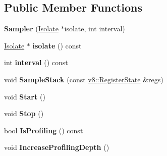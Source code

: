 \subsection*{Public Member Functions}
\begin{DoxyCompactItemize}
\item 
{\bfseries Sampler} (\hyperlink{classv8_1_1internal_1_1_isolate}{Isolate} $\ast$isolate, int interval)\hypertarget{classv8_1_1internal_1_1_sampler_a2a11e616d00bc5369d44e76113ff48bb}{}\label{classv8_1_1internal_1_1_sampler_a2a11e616d00bc5369d44e76113ff48bb}

\item 
\hyperlink{classv8_1_1internal_1_1_isolate}{Isolate} $\ast$ {\bfseries isolate} () const \hypertarget{classv8_1_1internal_1_1_sampler_ac03a5a700f506b92eeec457aaa618d21}{}\label{classv8_1_1internal_1_1_sampler_ac03a5a700f506b92eeec457aaa618d21}

\item 
int {\bfseries interval} () const \hypertarget{classv8_1_1internal_1_1_sampler_a95ac452fc3a30dff69891f742a5c9488}{}\label{classv8_1_1internal_1_1_sampler_a95ac452fc3a30dff69891f742a5c9488}

\item 
void {\bfseries Sample\+Stack} (const \hyperlink{structv8_1_1_register_state}{v8\+::\+Register\+State} \&regs)\hypertarget{classv8_1_1internal_1_1_sampler_a9a8ee8fc9e59968d010ead4a0ac293d1}{}\label{classv8_1_1internal_1_1_sampler_a9a8ee8fc9e59968d010ead4a0ac293d1}

\item 
void {\bfseries Start} ()\hypertarget{classv8_1_1internal_1_1_sampler_a49677027e31c1bbe7f6bd66267b9d0db}{}\label{classv8_1_1internal_1_1_sampler_a49677027e31c1bbe7f6bd66267b9d0db}

\item 
void {\bfseries Stop} ()\hypertarget{classv8_1_1internal_1_1_sampler_a2147ae394fb08970b4e8bc493bafcbc9}{}\label{classv8_1_1internal_1_1_sampler_a2147ae394fb08970b4e8bc493bafcbc9}

\item 
bool {\bfseries Is\+Profiling} () const \hypertarget{classv8_1_1internal_1_1_sampler_a378c62a3939febba846baaf5eee7023e}{}\label{classv8_1_1internal_1_1_sampler_a378c62a3939febba846baaf5eee7023e}

\item 
void {\bfseries Increase\+Profiling\+Depth} ()\hypertarget{classv8_1_1internal_1_1_sampler_aaf362dfc4fb6f48307885325befe0763}{}\label{classv8_1_1internal_1_1_sampler_aaf362dfc4fb6f48307885325befe0763}


\end{DoxyCompactItemize}
